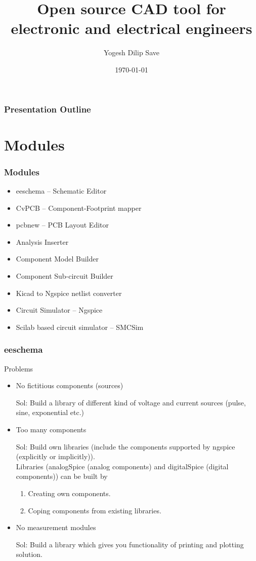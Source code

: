 \documentclass{beamer}
\title
{Open source CAD tool for electronic and electrical engineers}
\author[]
{Yogesh Dilip Save}
\institute
{
  Indian Institute of Technology, Bombay
}
\date[seminar] %
{\today}
\begin{document}
\begin{frame}
  \titlepage
\end{frame}
\begin{frame}
  \frametitle{Presentation Outline}
  \tableofcontents
\end{frame}

\section{Modules}
\begin{frame}
 \frametitle{Modules}
\begin{block}{}
\begin{itemize}
\item eeschema -- Schematic Editor
\item CvPCB -- Component-Footprint mapper
\item pcbnew -- PCB Layout Editor
\item Analysis Inserter
\item Component Model Builder
\item Component Sub-circuit Builder
\item Kicad to Ngspice netlist converter
\item Circuit Simulator -- Ngspice
\item Scilab based circuit simulator -- SMCSim
\end{itemize}
\end{block}
\end{frame}

\begin{frame}
\frametitle{eeschema}
\begin{block}{Problems}
\begin{itemize}
\item No fictitious components (sources) 
\item[Sol:] Build a library of different kind of voltage and current sources (pulse, sine, exponential etc.)
\item Too many components
\item[Sol:] Build own libraries (include the components supported by ngspice (explicitly or implicitly)). \\
   Libraries (analogSpice (analog components) and digitalSpice (digital components)) can be built by
   \begin{enumerate}
     \item Creating own components.
     \item Coping components from existing libraries.
   \end{enumerate}
\item No measurement modules
\item[Sol:] Build a library which gives you functionality of printing and plotting solution.  
\end{itemize}
\end{block}
\end{frame}
\end{document}
